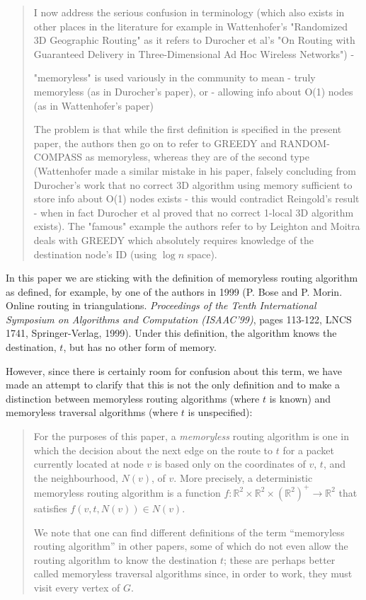 \documentclass{article}
\newcommand{\R}{\mathbb{R}}
\begin{document}
\begin{quote}
I now address the serious confusion in terminology (which also exists in
other places in the literature for example in Wattenhofer's "Randomized 3D
Geographic Routing" as it refers to Durocher et al's "On Routing with Guaranteed
Delivery in Three-Dimensional Ad Hoc Wireless Networks") -

"memoryless" is used variously in the community to mean
- truly memoryless (as in Durocher's paper), or
- allowing info about O(1) nodes (as in Wattenhofer's paper)

The problem is that while the first definition is specified in the present
paper, the authors then go on to refer to GREEDY and RANDOM-COMPASS as
memoryless, whereas they are of the second type (Wattenhofer made a similar
mistake in his paper, falsely concluding from Durocher's work that
no correct 3D algorithm using memory sufficient to store info about O(1)
nodes exists - this would contradict Reingold's result - when in fact
Durocher et al proved that no correct 1-local 3D algorithm exists). The
"famous" example the authors refer to by Leighton and Moitra deals with
GREEDY which absolutely requires knowledge of the destination node's ID
(using $\log n$ space).
\end{quote}


In this paper we are sticking with the definition of memoryless routing algorithm as defined, for example, by one of the authors in 1999 (P. Bose and P. Morin. Online routing in triangulations. 
\emph{Proceedings of the Tenth International Symposium on Algorithms and Computation (ISAAC'99)}, pages 113-122, LNCS 1741, Springer-Verlag, 1999).  Under this definition, the algorithm knows the destination, $t$, but has no other form of memory.

However, since there is certainly room for confusion about this term, we have made an attempt to clarify that this is not the only definition and to make a distinction between memoryless routing algorithms (where $t$ is known) and memoryless traversal algorithms (where $t$ is unspecified):

\begin{quote}
 For the purposes of this paper, a \emph{memoryless} routing algorithm is one in which the decision about the next edge on the route to $t$ for a packet currently located at node $v$ is based only on the coordinates of $v$, $t$, and the neighbourhood, $N(v)$, of $v$. More precisely, a deterministic memoryless routing algorithm is a function $f:\R^2\times\R^2\times(\R^2)^+\rightarrow \R^2$ that satisfies $f(v,t,N(v)) \in N(v)$.  

We note that one can find different definitions of the term ``memoryless routing algorithm'' in other papers, some of which do not even allow the routing algorithm to know the destination $t$; these are perhaps better called memoryless traversal algorithms since, in order to work, they must visit every vertex of $G$.
\end{quote}
\end{document}
